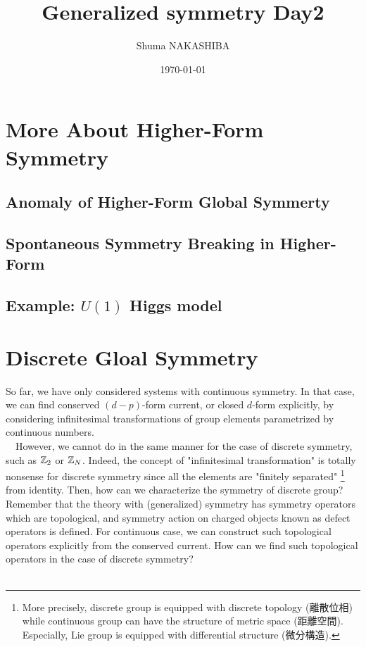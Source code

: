 \documentclass{ltjsarticle}
\title{Generalized symmetry Day2}
\author{Shuma NAKASHIBA}
\date{\today}
\theoremstyle{mystyle} %
\numberwithin{equation}{section}
\begin{document}
\maketitle

\setcounter{tocdepth}{2}
\tableofcontents
\newpage
\section{More About Higher-Form Symmetry}
\subsection{Anomaly of Higher-Form Global Symmerty}
\subsection{Spontaneous Symmetry Breaking in Higher-Form}
\subsection{Example: $U(1)$ Higgs model}
%
\newpage
\section{Discrete Gloal Symmetry}
So far, we have only considered systems with continuous symmetry. 
In that case, we can find conserved $(d-p)$-form current, or closed $d$-form explicitly, 
by considering infinitesimal transformations of group elements parametrized by continuous numbers. \\
　However, we cannot do in the same manner for the case of discrete symmetry, 
such as $\mathbb{Z}_2$ or $\mathbb{Z}_N$. 
Indeed, the concept of "infinitesimal transformation" is totally nonsense for discrete symmetry 
since all the elements are "finitely separated"
\footnote{
    More precisely, 
    discrete group is equipped with discrete topology (離散位相) while 
    continuous group can have the structure of metric space (距離空間). 
    Especially, Lie group is equipped with differential structure (微分構造). 
} from identity. 
Then, how can we characterize the symmetry of discrete group? 
Remember that the theory with (generalized) symmetry has symmetry operators which are topological, 
and symmetry action on charged objects known as defect operators is defined. 
For continuous case, we can construct such topological operators explicitly from the conserved current. 
How can we find such topological operators in the case of discrete symmetry? \\\\
\end{document}
